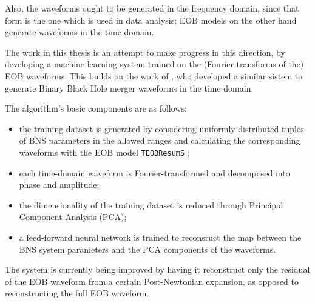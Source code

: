 \documentclass[11pt]{article}
\begin{document}
Also, the waveforms ought to be generated in the frequency domain, since that form is the one which is used in data analysis; EOB models on the other hand generate waveforms in the time domain. 

The work in this thesis is an attempt to make progress in this direction, by developing a machine learning system trained on the (Fourier transforms of the) EOB waveforms. 
This builds on the work of \textcite{schmidtMachineLearningGravitational2020}, who developed a similar sistem to generate Binary Black Hole merger waveforms in the time domain.

The algorithm's basic components are as follows:
\begin{itemize}
    \item the training dataset is generated by considering uniformly distributed tuples of BNS parameters in the allowed ranges and calculating the corresponding waveforms with the EOB model \texttt{TEOBResumS} \cite[]{nagarTimedomainEffectiveonebodyGravitational2018};
    \item each time-domain waveform is Fourier-transformed and decomposed into phase and amplitude;
    \item the dimensionality of the training dataset is reduced through Principal Component Analysis (PCA);
    \item a feed-forward neural network is trained to reconsruct the map between the BNS system parameters and the PCA components of the waveforms. 
\end{itemize}

The system is currently being improved by having it reconstruct only the residual of the EOB waveform from a certain Post-Newtonian expansion, as opposed to reconstructing the full EOB waveform. 


\printbibliography
\end{document}
